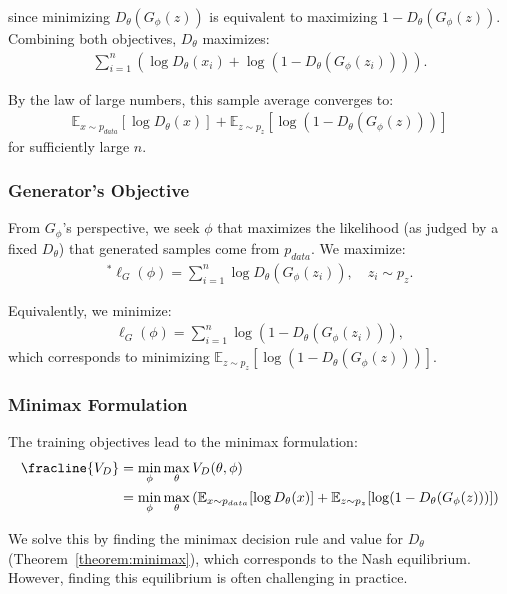 since minimizing $D_\theta(G_\phi(z))$ is equivalent to maximizing $1 - D_\theta(G_\phi(z))$. Combining both objectives, $D_\theta$ maximizes:
\begin{align}
  \sum_{i=1}^n \left( \log D_\theta(x_i) + \log(1 - D_\theta(G_\phi(z_i))) \right).
\end{align}

By the law of large numbers, this sample average converges to:
\begin{align}
  \label{eq:objective-for-d}
  \mathbb{E}_{x \sim p_{data}}[\log D_\theta(x)] + \mathbb{E}_{z \sim p_z}[\log(1 - D_\theta(G_\phi(z)))]
\end{align}
for sufficiently large $n$.

\subsubsection{Generator's Objective}%
\label{sec:derivation-g}

From $G_\phi$'s perspective, we seek $\phi$ that maximizes the likelihood (as judged by a fixed $D_\theta$) that generated samples come from $p_{data}$. We maximize:
\begin{align}
  ^*\ell_G(\phi) = \sum_{i=1}^n \log D_\theta(G_\phi(z_i)), \quad z_i \sim p_z.
\end{align}

Equivalently, we minimize:
\begin{align}
  \ell_G(\phi) = \sum_{i=1}^n \log(1 - D_\theta(G_\phi(z_i))),
\end{align}
which corresponds to minimizing $\mathbb{E}_{z \sim p_z}[\log(1 - D_\theta(G_\phi(z)))]$.

\subsubsection{Minimax Formulation}

The training objectives lead to the minimax formulation:
\begin{align}
  \fracline{V_D} & = \min_{\phi}\max_{\theta} V_D(\theta, \phi) \\
                  & = \min_{\phi}\max_{\theta} \left( \mathbb{E}_{x \sim p_{data}}[\log D_\theta(x)] + \mathbb{E}_{z \sim p_z}[\log(1 - D_\theta(G_\phi(z)))] \right)
\end{align}

We solve this by finding the minimax decision rule and value for $D_\theta$ (Theorem~\ref{theorem:minimax}), which corresponds to the Nash equilibrium. However, finding this equilibrium is often challenging in practice.

